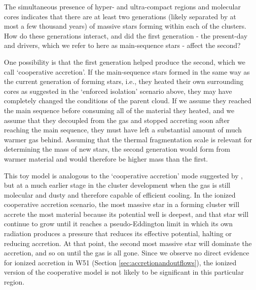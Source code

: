 \documentclass{emulateapj}
\begin{document}
The simultaneous presence of hyper- and ultra-compact \hii regions and
molecular cores indicates that there are at least two generations (likely
separated by at most a few thousand years) of massive stars forming within each
of the clusters.  How do these generations interact, and did the first
generation - the present-day \hchii and \uchii drivers, which we refer to here
as main-sequence stars - affect the second?

One possibility is that the first generation helped produce the second,
which we call `cooperative accretion'.
If the main-sequence stars formed in the same way as the current generation of
forming stars, i.e., they heated their own surrounding cores as suggested in
the `enforced isolation' scenario above, they may have completely changed the
conditions of the parent cloud.  If we assume they reached the main sequence
before consuming all of the material they heated, and we assume that they
decoupled from the gas and stopped accreting soon after reaching the main
sequence, they must have left a substantial amount of much warmer gas behind.
Assuming that the thermal fragmentation scale is relevant for determining
the mass of new stars, the second generation would form from warmer material
and would therefore be higher mass than the first.


This toy model is analogous to the `cooperative accretion' mode suggested by
\citet{Zinnecker2007a}, but at a much earlier stage in the cluster development
when the gas is still molecular and dusty and therefore capable of efficient
cooling.  In the ionized cooperative accretion scenario, the most massive star
in a forming cluster will accrete the most material because its potential well
is deepest, and that star will continue to grow until it reaches a
pseudo-Eddington limit in which its own radiation produces a pressure that
reduces its effective potential, halting or reducing accretion.  At that point,
the second most massive star will dominate the accretion, and so on until the
gas is all gone.  Since we observe no direct evidence for ionized accretion in
W51 (Section \ref{sec:accretionandoutflows}), the ionized version of the
cooperative model is not likely to be significant in this particular region.
\end{document}
